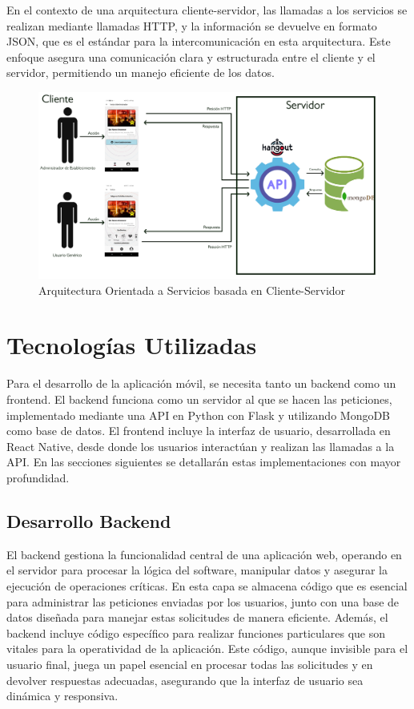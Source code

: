 En el contexto de una arquitectura cliente-servidor, las llamadas a los servicios se realizan mediante llamadas HTTP, y la información se devuelve en formato JSON, que es el estándar para la intercomunicación en esta arquitectura. Este enfoque asegura una comunicación clara y estructurada entre el cliente y el servidor, permitiendo un manejo eficiente de los datos.

\begin{figure}[H]
    \centering
    \includegraphics[width=\textwidth]{imagenes/ARQUITECTURA.jpg}
    \caption{Arquitectura Orientada a Servicios basada en Cliente-Servidor}
    \label{fig:ARQUITECTURA}
\end{figure}


\section{Tecnologías Utilizadas}

Para el desarrollo de la aplicación móvil, se necesita tanto un backend como un frontend. El backend funciona como un servidor al que se hacen las peticiones, implementado mediante una API en Python con Flask y utilizando MongoDB como base de datos. El frontend incluye la interfaz de usuario, desarrollada en React Native, desde donde los usuarios interactúan y realizan las llamadas a la API. En las secciones siguientes se detallarán estas implementaciones con mayor profundidad.

\subsection{Desarrollo Backend}

El backend gestiona la funcionalidad central de una aplicación web, operando en el servidor para procesar la lógica del software, manipular datos y asegurar la ejecución de operaciones críticas. En esta capa se almacena código que es esencial para administrar las peticiones enviadas por los usuarios, junto con una base de datos diseñada para manejar estas solicitudes de manera eficiente. Además, el backend incluye código específico para realizar funciones particulares que son vitales para la operatividad de la aplicación. Este código, aunque invisible para el usuario final, juega un papel esencial en procesar todas las solicitudes y en devolver respuestas adecuadas, asegurando que la interfaz de usuario sea dinámica y responsiva.

